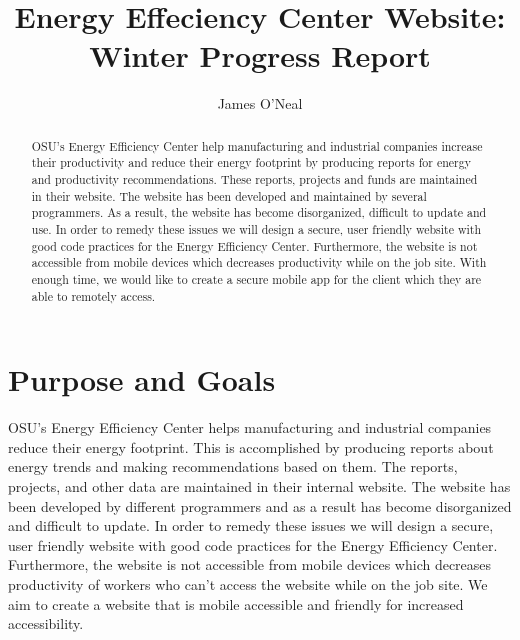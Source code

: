 \documentclass[letterpaper,10pt,titlepage,journal,compsoc,draftclsnofoot,onecolumn]{IEEEtran}
\title{Energy Effeciency Center Website: \\ Winter Progress Report}
\author{James O'Neal}
\newcommand\tab[1][1cm]{\hspace*{#1}}
\begin{document}
\begin{titlingpage}
    \maketitle
	\centering{}
    \begin{abstract}
        
        OSU’s Energy Efficiency Center help manufacturing and industrial companies increase their productivity and reduce their energy footprint by producing reports for energy and productivity recommendations. These reports, projects and funds are maintained in their website. The website has been developed and maintained by several programmers. As a result, the website has become disorganized, difficult to update and use. In order to remedy these issues we will design a secure, user friendly website with good code practices for the Energy Efficiency Center. 	Furthermore, the website is not accessible from mobile devices which decreases productivity while on the job site. With enough time, we would like to create a secure mobile app for the client which they are able to remotely access.
        
    \end{abstract}
\end{titlingpage}

\newpage

\tableofcontents{}

\newpage


\section{Purpose and Goals}

\tab OSU’s Energy Efficiency Center helps manufacturing and industrial companies reduce their energy footprint. This is accomplished by producing reports about energy trends and making recommendations based on them. The reports, projects, and other data are maintained in their internal website. The website has been developed by different programmers and as a result has become disorganized and difficult to update. In order to remedy these issues we will design a secure, user friendly website with good code practices for the Energy Efficiency Center. Furthermore, the website is not accessible from mobile devices which decreases productivity of workers who can’t access the website while on the job site. We aim to create a website that is mobile accessible and friendly for increased accessibility.
\end{document}
